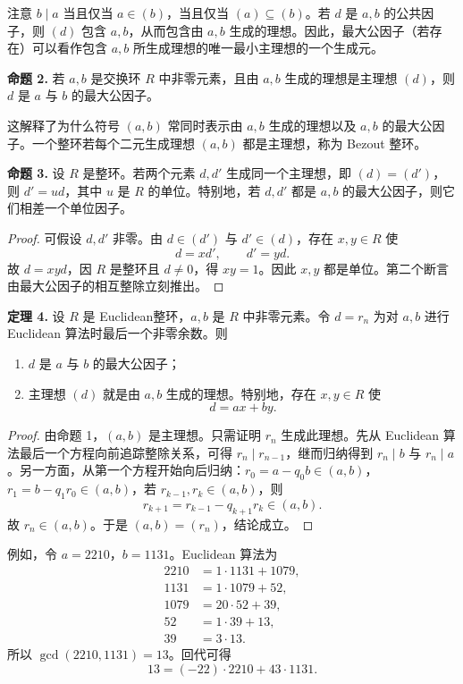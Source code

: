 注意 $b\mid a$ 当且仅当 $a\in(b)$，当且仅当 $(a)\subseteq(b)$。若 $d$ 是 $a,b$ 的公共因子，则 $(d)$ 包含 $a,b$，从而包含由 $a,b$ 生成的理想。因此，最大公因子（若存在）可以看作包含 $a,b$ 所生成理想的唯一最小主理想的一个生成元。

\noindent\textbf{命题 2.}
若 $a,b$ 是交换环 $R$ 中非零元素，且由 $a,b$ 生成的理想是主理想 $(d)$，则 $d$ 是 $a$ 与 $b$ 的最大公因子。

这解释了为什么符号 $(a,b)$ 常同时表示由 $a,b$ 生成的理想以及 $a,b$ 的最大公因子。一个整环若每个二元生成理想 $(a,b)$ 都是主理想，称为 Bezout 整环。

\noindent\textbf{命题 3.}
设 $R$ 是整环。若两个元素 $d,d'$ 生成同一个主理想，即 $(d)=(d')$，则 $d'=ud$，其中 $u$ 是 $R$ 的单位。特别地，若 $d,d'$ 都是 $a,b$ 的最大公因子，则它们相差一个单位因子。

\begin{proof}
	可假设 $d,d'$ 非零。由 $d\in(d')$ 与 $d'\in(d)$，存在 $x,y\in R$ 使
	\[
	d=xd',\qquad d'=yd.
	\]
	故 $d=xyd$，因 $R$ 是整环且 $d\neq0$，得 $xy=1$。因此 $x,y$ 都是单位。第二个断言由最大公因子的相互整除立刻推出。
\end{proof}

\noindent\textbf{定理 4.}
设 $R$ 是 Euclidean整环，$a,b$ 是 $R$ 中非零元素。令 $d=r_n$ 为对 $a,b$ 进行 Euclidean 算法时最后一个非零余数。则
\begin{enumerate}[label=(\arabic*)]
	\item $d$ 是 $a$ 与 $b$ 的最大公因子；
	\item 主理想 $(d)$ 就是由 $a,b$ 生成的理想。特别地，存在 $x,y\in R$ 使
	\[
	d=ax+by.
	\]
\end{enumerate}

\begin{proof}
	由命题 1，$(a,b)$ 是主理想。只需证明 $r_n$ 生成此理想。先从 Euclidean 算法最后一个方程向前追踪整除关系，可得 $r_n\mid r_{n-1}$，继而归纳得到 $r_n\mid b$ 与 $r_n\mid a$。另一方面，从第一个方程开始向后归纳：$r_0=a-q_0b\in(a,b)$，$r_1=b-q_1r_0\in(a,b)$，若 $r_{k-1},r_k\in(a,b)$，则
	\[
	r_{k+1}=r_{k-1}-q_{k+1}r_k\in(a,b).
	\]
	故 $r_n\in(a,b)$。于是 $(a,b)=(r_n)$，结论成立。
\end{proof}

例如，令 $a=2210$，$b=1131$。Euclidean 算法为
\begin{align*}
	2210&=1\cdot1131+1079,\\
	1131&=1\cdot1079+52,\\
	1079&=20\cdot52+39,\\
	52&=1\cdot39+13,\\
	39&=3\cdot13.
\end{align*}
所以 $\gcd(2210,1131)=13$。回代可得
\[
13=(-22)\cdot2210+43\cdot1131.
\]

